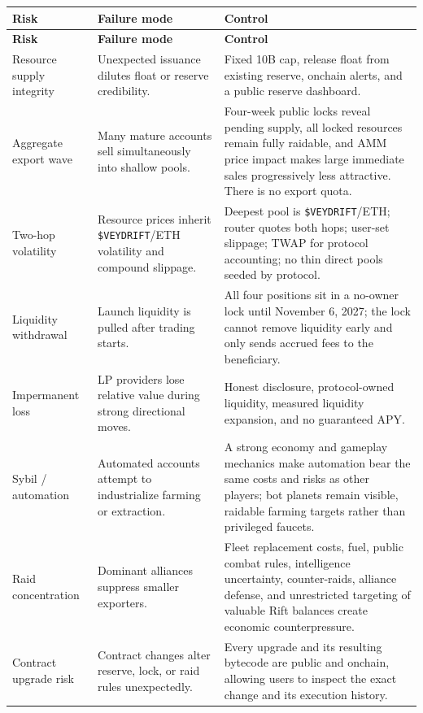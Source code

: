 \documentclass[11pt]{article}
\newcommand{\token}[1]{\texttt{\$#1}}
\begin{document}
\begin{longtable}{@{}p{}p{}p{}@{}}
\toprule
\textbf{Risk} & \textbf{Failure mode} & \textbf{Control} \\
\midrule
\endfirsthead
\toprule
\textbf{Risk} & \textbf{Failure mode} & \textbf{Control} \\
\midrule
\endhead
Resource supply integrity & Unexpected issuance dilutes float or reserve credibility. & Fixed 10B cap, release float from existing reserve, onchain alerts, and a public reserve dashboard. \\
\addlinespace
Aggregate export wave & Many mature accounts sell simultaneously into shallow pools. & Four-week public locks reveal pending supply, all locked resources remain fully raidable, and AMM price impact makes large immediate sales progressively less attractive. There is no export quota. \\
\addlinespace
Two-hop volatility & Resource prices inherit \token{VEYDRIFT}/ETH volatility and compound slippage. & Deepest pool is \token{VEYDRIFT}/ETH; router quotes both hops; user-set slippage; TWAP for protocol accounting; no thin direct pools seeded by protocol. \\
\addlinespace
Liquidity withdrawal & Launch liquidity is pulled after trading starts. & All four positions sit in a no-owner lock until November 6, 2027; the lock cannot remove liquidity early and only sends accrued fees to the beneficiary. \\
\addlinespace
Impermanent loss & LP providers lose relative value during strong directional moves. & Honest disclosure, protocol-owned liquidity, measured liquidity expansion, and no guaranteed APY. \\
\addlinespace
Sybil / automation & Automated accounts attempt to industrialize farming or extraction. & A strong economy and gameplay mechanics make automation bear the same costs and risks as other players; bot planets remain visible, raidable farming targets rather than privileged faucets. \\
\addlinespace
Raid concentration & Dominant alliances suppress smaller exporters. & Fleet replacement costs, fuel, public combat rules, intelligence uncertainty, counter-raids, alliance defense, and unrestricted targeting of valuable Rift balances create economic counterpressure. \\
\addlinespace
Contract upgrade risk & Contract changes alter reserve, lock, or raid rules unexpectedly. & Every upgrade and its resulting bytecode are public and onchain, allowing users to inspect the exact change and its execution history. \\
\bottomrule
\end{longtable}
\end{document}
